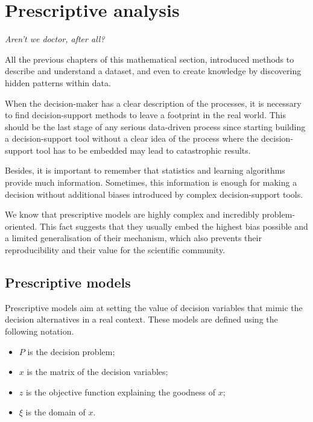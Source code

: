 \chapter{Prescriptive analysis}{}

\epigraph{\textit{Aren’t we doctor, after all?}}{}

All the previous chapters of this mathematical section, introduced methods to describe and understand a dataset, and even to create knowledge by discovering hidden patterns within data.\par

When the decision-maker has a clear description of the processes, it is necessary to find decision-support methods to leave a footprint in the real world. This should be the last stage of any serious data-driven process since starting building a decision-support tool without a clear idea of the process where the decision-support tool has to be embedded may lead to catastrophic results.\par

Besides, it is important to remember that statistics and learning algorithms provide much information. Sometimes, this information is enough for making a decision without additional biases introduced by complex decision-support tools.\par

We know that prescriptive models are highly complex and incredibly problem-oriented. This fact suggests that they usually embed the highest bias possible and a limited generalisation of their mechanism, which also prevents their reproducibility and their value for the scientific community.\par

\section{Prescriptive models}
Prescriptive models aim at setting the value of decision variables that mimic the decision alternatives in a real context. These models are defined using the following notation.

\begin{itemize}
    \item $P$ is the decision problem;
    \item $x$ is the matrix of the decision variables;
    \item $z$ is the objective function explaining the goodness of $x$;
    \item $\xi$ is the domain of $x$.
\end{itemize}

